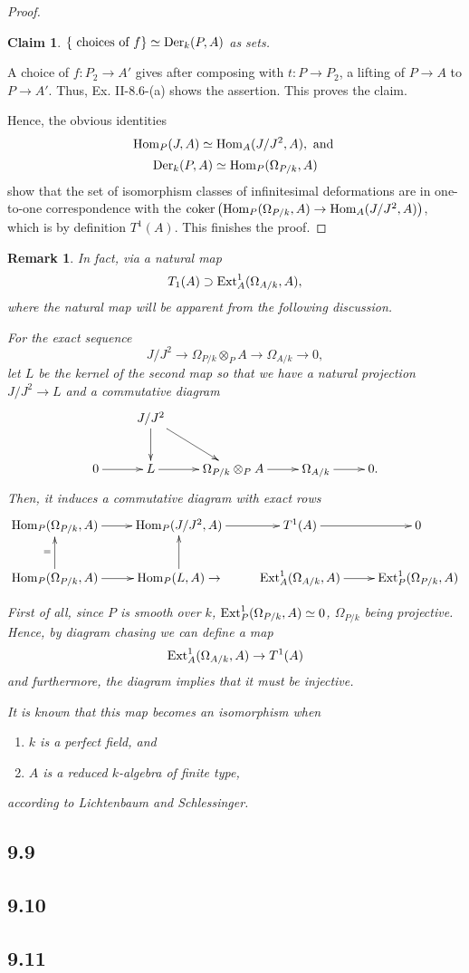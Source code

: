 \documentclass[11pt]{amsart}          %
\newcommand{\coker}{{\rm coker}}
\newcommand{\ext}{{\rm Ext}}
\newcommand{\der}{{\rm Der}}
\newtheorem*{claim}{Claim}
\newtheorem*{remark}{Remark}
\renewcommand{\hom}{{\rm Hom}}
\begin{document}
\begin{proof}
\begin{claim}
$\{ \mbox{ choices of } f \} \simeq \der_k (P, A)$ as sets.
\end{claim} A choice of $f: P_2 \to A'$ gives after composing with $t: P \to P_2$, a lifting of $P \to A$ to $P \to A'$. Thus, Ex. II-8.6-(a) shows the assertion. This proves the claim.

Hence, the obvious identities
$$\hom_P (J, A) \simeq \hom_A (J/J^2, A), \mbox{ and } $$
$$\der_k (P,A) \simeq \hom_P (\Omega_{P/k}, A)$$ show that the set of isomorphism classes of infinitesimal deformations are in one-to-one correspondence with the $\coker \left(\hom_P (\Omega_{P/k}, A) \to \hom_A (J/J^2 , A) \right)$, which is by definition $T^1 (A)$. This finishes the proof.
\end{proof}

\begin{remark}{\rm In fact, via a natural map $$T_1 (A) \supset \ext_A ^1 (\Omega_{A/k}, A),$$ where the natural map will be apparent from the following discussion.

For the exact sequence $$J/J^2 \to \Omega_{P/k} \otimes_P A \to \Omega_{A/k} \to 0,$$ let $L $ be the kernel of the second map so that we have a natural projection $J/J^2 \to L$ and a commutative diagram
$$\xymatrix{ & J/J^2 \ar[d] \ar[dr] & & & \\ 0 \ar[r] & L \ar[r] & \Omega_{P/k} \otimes_P A \ar[r] & \Omega_{A/k} \ar[r] & 0.}$$ Then, it induces a commutative diagram with exact rows
$$\xymatrix{ \hom_P (\Omega_{P/k} , A) \ar[r] & \hom_P (J/J^2, A) \ar[r] & T^1 (A) \ar[r] & 0 \\
\hom_P (\Omega_{P/k}, A) \ar[u]^= \ar[r] & \hom_P (L, A) \ar[u] \to & \ext_A ^1 (\Omega_{A/k}, A) \ar[r] & \ext_P ^1 (\Omega_{P/k}, A) }$$  

First of all, since $P$ is smooth over $k$, $\ext_P ^1 (\Omega_{P/k}, A) \simeq 0$, $\Omega_{P/k}$ being projective. Hence, by diagram chasing we can define a map $$\ext_A ^1 (\Omega_{A/k}, A) \to T^1 (A)$$ and furthermore, the diagram implies that it must be injective.

It is known that this map becomes an isomorphism when
\begin{enumerate}
\item $k$ is a perfect field, and
\item $A$ is a reduced $k$-algebra of finite type,
\end{enumerate} according to Lichtenbaum and Schlessinger.
}
\end{remark}

\subsection*{9.9}
\subsection*{9.10}
\subsection*{9.11}
\end{document}
